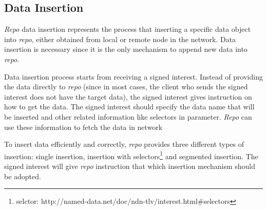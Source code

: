 \documentclass[conference]{IEEEtran}
\begin{document}
\subsection{Data Insertion}

\emph{Repo} data insertion represents the process that inserting a specific data object into \emph{repo}, either obtained from local or remote node in the network. Data insertion is necessary since it is the only mechanism to append new data into \emph{repo}.

Data insertion process starts from receiving a signed interest. Instead of providing the data directly to \emph{repo} (since in most cases, the client who sends the signed interest does not have the target data), the signed interest gives instruction on how to get the data. The signed interest should specify the data name that will be inserted and other related information like selectors in parameter. \emph{Repo} can use these information to fetch the data in network

To insert data efficiently and correctly, \emph{repo} provides three different types of insertion: single insertion, insertion with selectors\footnote{selctor: http://named-data.net/doc/ndn-tlv/interest.html\#selectors} and segmented insertion. The signed interest will give \emph{repo} instruction that which insertion mechanism should be adopted.
\end{document}

